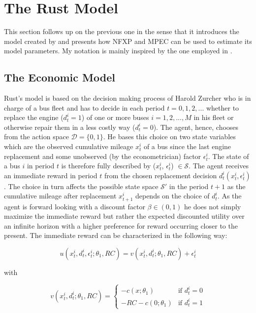 \section{The Rust Model}
\thispagestyle{plain} %

This section follows up on the previous one in the sense that it introduces the model created by \cite{Rust.1987} and presents how NFXP and MPEC can be used to estimate its model parameters. My notation is mainly inspired by the one employed in \cite{Su.Judd.2012}. 

\subsection{The Economic Model}

Rust's model is based on the decision making process of Harold Zurcher who is in charge of a bus fleet and has to decide in each period $t = 0, 1, 2, ...$ whether to replace the engine ($d^i_t=1$) of one or more buses $i = 1, 2, ..., M$ in his fleet or otherwise repair them in a less costly way ($d^i_t=0$). The agent, hence, chooses from the action space $\mathcal{D} = \{0, 1\}$. He bases this choice on two state variables which are the observed cumulative mileage $x^i_t$ of a bus since the last engine replacement and some unobserved (by the econometrician) factor $\epsilon^i_t$. The state of a bus $i$ in period $t$ is therefore fully described by ($x^i_t$, $\epsilon^i_t$) $\in \mathcal{S}$. The agent receives an immediate reward in period $t$ from the chosen replacement decision $d^i_t(x^i_t, \epsilon^i_t)$. The choice in turn affects the possible state space $\mathcal{S'}$ in the period $t+1$ as the cumulative mileage after replacement $x^i_{t+1}$ depends on the choice of $d^i_t$. As the agent is forward looking with a discount factor $\beta \in (0, 1)$ he does not simply maximize the immediate reward but rather the expected discounted utility over an infinite horizon with a higher preference for reward occurring closer to the present. The immediate reward can be characterized in the following way: 

\begin{equation}
	u(x^i_t, d^i_t, \epsilon^i_t; \theta_1, RC) = v(x^i_t, d^i_t; \theta_1, RC) + \epsilon^i_t
\end{equation}

with 

\[v(x^i_t, d^i_t; \theta_1, RC) = \left\{
\begin{array}{lr}
-c(x; \theta_1)  & \mbox{if } d^i_t = 0 \\
-RC -c(0;\theta_1) & \mbox{if } d^i_t = 1
\end{array}
\right.
\]

